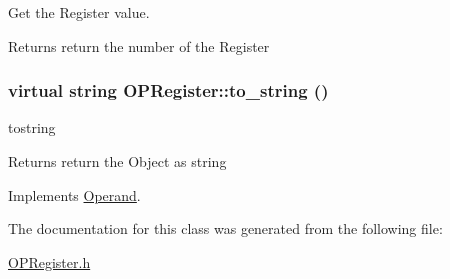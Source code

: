 Get the Register value. \begin{DoxyReturn}{Returns}
return the number of the Register 
\end{DoxyReturn}
\hypertarget{classOPRegister_a9f55bdff75224fb18973a9e913a4022f}{
\subsubsection[{to\_\-string}]{\setlength{\rightskip}{0pt plus 5cm}virtual string OPRegister::to\_\-string ()}}
\label{classOPRegister_a9f55bdff75224fb18973a9e913a4022f}


tostring \begin{DoxyReturn}{Returns}
return the Object as string 
\end{DoxyReturn}


Implements \hyperlink{classOperand_a28aed96d5fafee66be81c30c1435ad00}{Operand}.

The documentation for this class was generated from the following file:\begin{DoxyCompactItemize}
\item 
\hyperlink{OPRegister_8h}{OPRegister.h}\end{DoxyCompactItemize}
